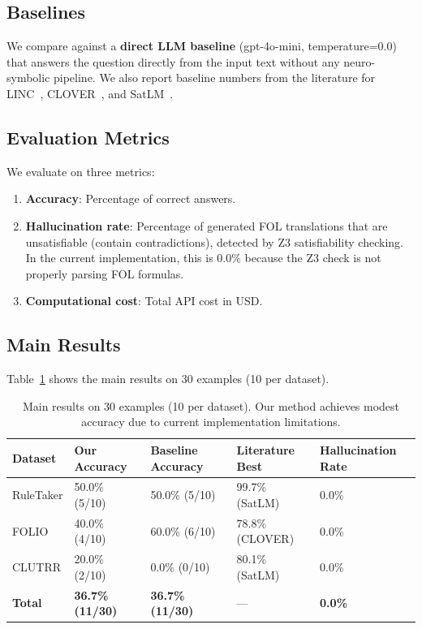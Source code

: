 \documentclass[11pt,letterpaper]{article}
\begin{document}
\subsection{Baselines}

We compare against a \textbf{direct LLM baseline} (gpt-4o-mini, temperature=0.0) that answers the question directly from the input text without any neuro-symbolic pipeline. We also report baseline numbers from the literature for LINC~\cite{Olausson2023}, CLOVER~\cite{Ryu2025}, and SatLM~\cite{Ye2023}.

\subsection{Evaluation Metrics}

We evaluate on three metrics:

\begin{enumerate}
    \item \textbf{Accuracy}: Percentage of correct answers.
    
    \item \textbf{Hallucination rate}: Percentage of generated FOL translations that are unsatisfiable (contain contradictions), detected by Z3 satisfiability checking. In the current implementation, this is 0.0\% because the Z3 check is not properly parsing FOL formulas.
    
    \item \textbf{Computational cost}: Total API cost in USD.
\end{enumerate}

\subsection{Main Results}

Table~\ref{tab:main_results} shows the main results on 30 examples (10 per dataset).

\begin{table}[!htbp]
\centering
\caption{Main results on 30 examples (10 per dataset). Our method achieves modest accuracy due to current implementation limitations.}
\label{tab:main_results}
\begin{tabular}{lllll}
\toprule
Dataset & Our Accuracy & Baseline Accuracy & Literature Best & Hallucination Rate \\
\midrule
RuleTaker & 50.0\% (5/10) & 50.0\% (5/10) & 99.7\% (SatLM) & 0.0\% \\
FOLIO & 40.0\% (4/10) & 60.0\% (6/10) & 78.8\% (CLOVER) & 0.0\% \\
CLUTRR & 20.0\% (2/10) & 0.0\% (0/10) & 80.1\% (SatLM) & 0.0\% \\
\textbf{Total} & \textbf{36.7\% (11/30)} & \textbf{36.7\% (11/30)} & --- & \textbf{0.0\%} \\
\bottomrule
\end{tabular}
\end{table}
\end{document}
